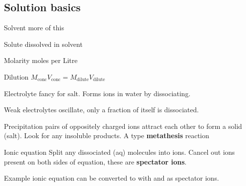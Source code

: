 \begin{mdframed}
\subsection{Solution basics}
\begin{multicols}{2}
\begin{compactdesc}
\item[Solvent] more of this
\item[Solute] dissolved in solvent
\item[Molarity] moles per Litre
\item[Dilution] $M_\text{conc}V_\text{conc} = M_\text{dilute}V_\text{dilute}$
\item[Electrolyte] fancy for salt. Forms ions in water by dissociating.
\item[Weak electrolytes] oscillate, only a fraction of itself is dissociated.
\item[Precipitation] pairs of oppositely charged ions attract each other
    to form a solid (salt). Look for any insoluble products.
    A type \textbf{metathesis} reaction 
\item[Ionic equation] Split any dissociated (aq) molecules into ions.
    Cancel out ions present on both sides of equation, these are
    \textbf{spectator ions}.
\item[Example ionic equation] 
    can be converted to 
    with  and  as spectator ions.
\end{compactdesc}
\end{multicols}
\end{mdframed}






